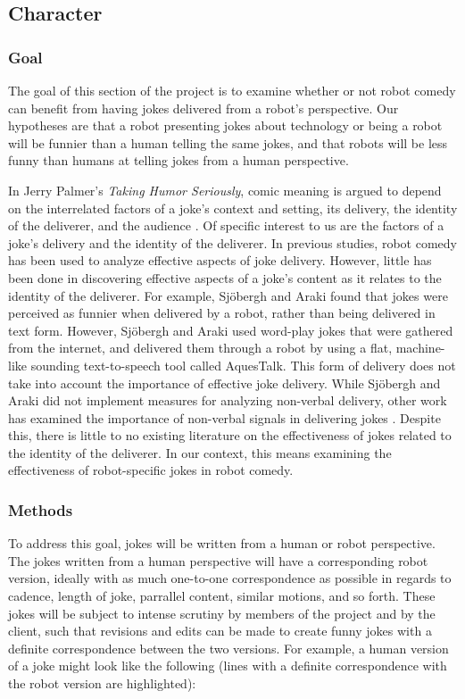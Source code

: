 \documentclass[onecolumn, draftclsnofoot,10pt, compsoc]{IEEEtran}
\begin{document}
\subsection{Character}
\subsubsection{Goal}
The goal of this section of the project is to examine whether or not robot comedy can benefit from having jokes delivered
from a robot’s perspective. Our hypotheses are that a robot presenting jokes about technology or being a robot will be
funnier than a human telling the same jokes, and that robots will be less funny than humans at telling jokes from a
human perspective.

In Jerry Palmer's \textit{Taking Humor Seriously}, comic meaning is argued to depend on the interrelated factors of a joke's context and setting, its delivery, the identity of the deliverer, and the audience \cite{Palmer:1993}.
Of specific interest to us are the factors of a joke's delivery and the identity of the deliverer.
In previous studies, robot comedy has been used to analyze effective aspects of joke delivery.
However, little has been done in discovering effective aspects of a joke's content as it relates to the identity of the deliverer.
For example, Sj\"{o}bergh and Araki \cite{RobotsMakeThings:2008} found that jokes were perceived as funnier when delivered by a robot, rather than being delivered in text form.
However, Sj\"{o}bergh and Araki used word-play jokes that were gathered from the internet, and delivered them through a robot by using a flat, machine-like sounding text-to-speech tool called AquesTalk. This form of delivery does not take into account the importance of effective joke delivery. While Sj\"{o}bergh and Araki did not implement measures for analyzing non-verbal delivery, other work has examined the importance of non-verbal signals in delivering jokes \cite{KatevasRobot:2014} \cite{KnightEightLessons:2011}.
Despite this, there is little to no existing literature on the effectiveness of jokes related to the identity of the deliverer.
In our context, this means examining the effectiveness of robot-specific jokes in robot comedy.

\subsubsection{Methods}
To address this goal, jokes will be written from a human or robot perspective. The jokes written from a human
perspective will have a corresponding robot version, ideally with as much one-to-one correspondence as possible in
regards to cadence, length of joke, parrallel content, similar motions, and so forth. These jokes will be subject to intense
scrutiny by members of the project and by the client, such that revisions and edits can be made to create funny jokes
with a definite correspondence between the two versions. For example, a human version of a joke might look like the
following (lines with a definite correspondence with the robot version are highlighted):
\end{document}
